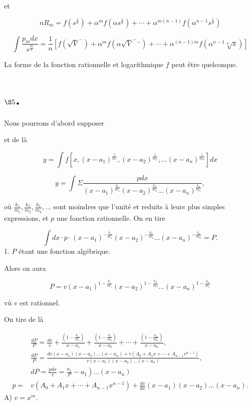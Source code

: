 \documentclass{article}
\begin{document}
et

\[
n R_{m}=f\left(s^{\frac{1}{n}}\right)+\alpha^{m} f\left(\alpha s^{\frac{1}{n}}\right)+\cdots+\alpha^{m(n-1)} f\left(\alpha^{n-1} s^{\frac{1}{n}}\right)
\]

\[
\int \frac{p_{m} d x}{s^{\frac{m}{n}}}=\frac{1}{n}\left[f\left(\sqrt{V}^{-}\right)+\alpha^{m} f\left(\alpha \sqrt{V}^{-}{ }^{-}\right)+\cdots+\alpha^{(n-1) m} f\left(\alpha^{n-1} \sqrt[n]{s}\right)\right]
\]

La forme de la fonction rationnelle et logarithmique \(f\) peut être quelconque.

\section*{\(\S 5\).}


Nous pourrons d'abord supposer

et de là

\[
y=\int f\left[x,\left(x-a_{1}\right)^{\frac{1}{m_{1}}},\left(x-a_{2}\right)^{\frac{1}{m_{2}}}, \ldots\left(x-a_{n}\right)^{\frac{1}{m_{n}}}\right] d x
\]

\[
y=\int \Sigma \frac{p d x}{\left(x-a_{1}\right)^{\frac{k_{1}}{m_{1}}}\left(x-a_{2}\right)^{\frac{k_{2}}{m_{2}}} \ldots\left(x-a_{n}\right)^{\frac{k_{n}}{m_{n}}}},
\]

où \(\frac{k_{1}}{m_{1}}, \frac{k_{2}}{m_{2}}, \frac{k_{3}}{m_{3}}, \ldots\) sont moindres que l'unité et reduits à leurs plus simples expressions, et \(p\) une fonction rationnelle. On en tire

\[
\int d x \cdot p \cdot\left(x-a_{1}\right)^{-\frac{k_{1}}{m_{1}}}\left(x-a_{2}\right)^{-\frac{k_{2}}{m_{2}}} \ldots\left(x-a_{n}\right)^{-\frac{k_{n}}{m_{n}}}=P .
\]
1. \(P\) étant une fonction algébrique.

Alors on aura

\[
P=v\left(x-a_{1}\right)^{1-\frac{k_{1}}{m_{1}}}\left(x-a_{2}\right)^{1-\frac{k_{2}}{m_{2}}} \ldots\left(x-a_{n}\right)^{1-\frac{k_{n}}{m_{n}}}
\]

vù \(v\) est rationnel.

On tire de là

\[
\begin{aligned}
& \frac{d P}{P}=\frac{d v}{v}+\frac{\left(1-\frac{k_{1}}{m_{1}}\right)}{x-a_{1}}+\frac{\left(1-\frac{k_{2}}{m_{2}}\right)}{x-a_{2}}+\cdots+\frac{\left(1-\frac{k_{n}}{m_{n}}\right)}{x-a_{n}}, \\
& \frac{d P}{P}=\frac{d v\left(x-a_{1}\right)\left(x-a_{2}\right) \ldots\left(x-a_{n}\right)+v\left(A_{0}+A_{1} x+\cdots+A_{n-1} v^{n-1}\right)}{v\left(x-a_{1}\right)\left(x-a_{2}\right) \ldots\left(x-a_{n}\right)}, \\
& \left.d P=\frac{p d x}{v}=\frac{a_{1}}{P}-a_{1}\right) \ldots\left(x-a_{n}\right) \\
p= & v\left(A_{0}+A_{1} x+\cdots+A_{n-1} x^{n-1}\right)+\frac{d v}{d x}\left(x-a_{1}\right)\left(x-a_{2}\right) \ldots\left(x-a_{n}\right) .
\end{aligned}
\]
A) \(v=x^{m}\).
\end{document}
